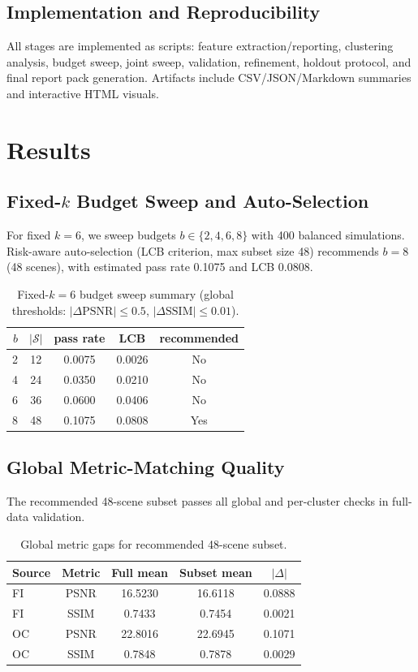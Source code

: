 \documentclass[10pt,twocolumn,letterpaper]{article}
\begin{document}
\subsection{Implementation and Reproducibility}
All stages are implemented as scripts: feature extraction/reporting, clustering analysis, budget sweep, joint sweep, validation, refinement, holdout protocol, and final report pack generation. Artifacts include CSV/JSON/Markdown summaries and interactive HTML visuals.

\section{Results}

\subsection{Fixed-\texorpdfstring{\(k\)}{k} Budget Sweep and Auto-Selection}
For fixed \(k=6\), we sweep budgets \(b\in\{2,4,6,8\}\) with 400 balanced simulations. Risk-aware auto-selection (LCB criterion, max subset size 48) recommends \(b=8\) (48 scenes), with estimated pass rate 0.1075 and LCB 0.0808.

\begin{table}[t]
\centering
\caption{Fixed-\(k=6\) budget sweep summary (global thresholds: \(|\Delta\mathrm{PSNR}|\le 0.5\), \(|\Delta\mathrm{SSIM}|\le 0.01\)).}
\label{tab:budget_sweep}
\begin{tabular}{rcccc}
\toprule
\(b\) & \(|\mathcal S|\) & pass rate & LCB & recommended \\
\midrule
2 & 12 & 0.0075 & 0.0026 & No \\
4 & 24 & 0.0350 & 0.0210 & No \\
6 & 36 & 0.0600 & 0.0406 & No \\
8 & 48 & 0.1075 & 0.0808 & Yes \\
\bottomrule
\end{tabular}
\end{table}

\subsection{Global Metric-Matching Quality}
The recommended 48-scene subset passes all global and per-cluster checks in full-data validation.

\begin{table}[t]
\centering
\caption{Global metric gaps for recommended 48-scene subset.}
\label{tab:global_gaps}
\begin{tabular}{lcccc}
\toprule
Source & Metric & Full mean & Subset mean & \(|\Delta|\) \\
\midrule
FI & PSNR & 16.5230 & 16.6118 & 0.0888 \\
FI & SSIM & 0.7433 & 0.7454 & 0.0021 \\
OC & PSNR & 22.8016 & 22.6945 & 0.1071 \\
OC & SSIM & 0.7848 & 0.7878 & 0.0029 \\
\bottomrule
\end{tabular}
\end{table}
\end{document}

